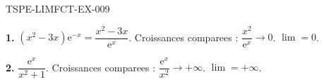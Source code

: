 \begin{corrige}{TSPE-LIMFCT-EX-009}

\textbf{1.} $(x^2-3x)\mathrm{e}^{-x} = \dfrac{x^2-3x}{\mathrm{e}^x}$. Croissances comparees : $\dfrac{x^2}{\mathrm{e}^x} \to 0$. $\boxed{\lim = 0}$.

\textbf{2.} $\dfrac{\mathrm{e}^x}{x^2+1}$. Croissances comparees : $\dfrac{\mathrm{e}^x}{x^2} \to +\infty$. $\boxed{\lim = +\infty}$.

\end{corrige}
